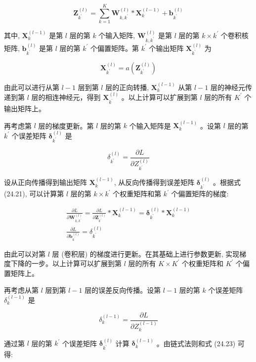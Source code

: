 \documentclass[10pt]{article}
\begin{document}
$$
\boldsymbol{Z}_{k^{\prime}}^{(l)}=\sum_{k=1}^{K} \boldsymbol{W}_{k, k^{\prime}}^{(l)} * \boldsymbol{X}_{k}^{(l-1)}+\boldsymbol{b}_{k^{\prime}}^{(l)}
$$

其中, $\boldsymbol{X}_{k}^{(l-1)}$ 是第 $l$ 层的第 $k$ 个输入矩阵, $\boldsymbol{W}_{k, k^{\prime}}^{(l)}$ 是第 $l$ 层的第 $k \times k^{\prime}$ 个卷积核矩阵, $\boldsymbol{b}_{k^{\prime}}^{(l)}$ 是第 $l$ 层的第 $k^{\prime}$ 个偏置矩阵。第 $k^{\prime}$ 个输出矩阵 $\boldsymbol{X}_{k^{\prime}}^{(l)}$ 为

$$
\boldsymbol{X}_{k^{\prime}}^{(l)}=a\left(\boldsymbol{Z}_{k^{\prime}}^{(l)}\right)
$$

由此可以进行从第 $l-1$ 层到第 $l$ 层的正向转播, $\boldsymbol{X}_{k}^{(l-1)}$ 从第 $l-1$ 层的神经元传递到第 $l$ 层的相连神经元，得到 $\boldsymbol{X}_{k^{\prime}}^{(l)}$ 。以上计算可以扩展到第 $l$ 层的所有 $K^{\prime}$ 个输出矩阵上。

再考虑第 $l$ 层的梯度更新。第 $l$ 层的第 $k$ 个输入矩阵是 $\boldsymbol{X}_{k}^{(l-1)}$ 。设第 $l$ 层的第 $k^{\prime}$ 个误差矩阵 $\boldsymbol{\delta}_{k^{\prime}}^{(l)}$ 是

$$
\delta_{k^{\prime}}^{(l)}=\frac{\partial L}{\partial Z_{k^{\prime}}^{(l)}}
$$

设从正向传播得到输出矩阵 $\boldsymbol{X}_{k}^{(l-1)}$, 从反向传播得到误差矩阵 $\boldsymbol{\delta}_{k^{\prime}}^{(l)}$ 。根据式 (24.21), 可以计算第 $l$ 层的第 $k \times k^{\prime}$ 个权重矩阵和第 $k^{\prime}$ 个偏置矩阵的梯度:


\begin{gather*}
\frac{\partial L}{\partial \boldsymbol{W}_{k, k^{\prime}}^{(l)}}=\frac{\partial L}{\partial \boldsymbol{Z}_{k^{\prime}}^{(l)}} * \boldsymbol{X}_{k}^{(l-1)}=\boldsymbol{\delta}_{k^{\prime}}^{(l)} * \boldsymbol{X}_{k}^{(l-1)}  \tag{24.24}\\
\frac{\partial L}{\partial \boldsymbol{b}_{k^{\prime}}^{(l)}}=\delta_{k^{\prime}}^{(l)} \tag{24.25}
\end{gather*}


由此可以对第 $l$ 层 (卷积层) 的梯度进行更新。在其基础上进行参数更新, 实现梯度下降的一步。以上计算可以扩展到第 $l$ 层的所有 $K \times K^{\prime}$ 个权重矩阵和 $K^{\prime}$ 个偏置矩阵上。

再考虑从第 $l$ 层到第 $l-1$ 层的误差反向传播。设第 $l-1$ 层的第 $k$ 个误差矩阵 $\delta_{k}^{(l-1)}$ 是

$$
\delta_{k}^{(l-1)}=\frac{\partial L}{\partial Z_{k}^{(l-1)}}
$$

通过第 $l$ 层的第 $k^{\prime}$ 个误差矩阵 $\boldsymbol{\delta}_{k^{\prime}}^{(l)}$ 计算 $\boldsymbol{\delta}_{k}^{(l-1)}$ 。由链式法则和式 (24.23) 可得:
\end{document}
